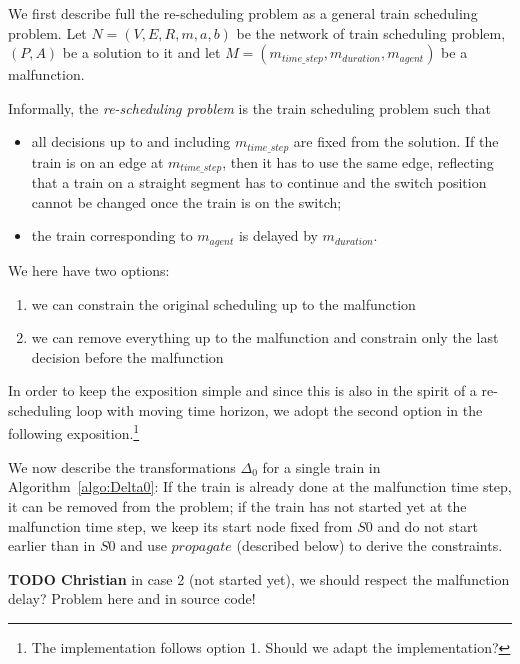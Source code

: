 \documentclass{article}
\begin{document}
We first describe full the re-scheduling problem as a general train scheduling problem. Let $N=(V,E,R,m,a,b)$ be the network of train scheduling problem, $(P,A)$ be a solution to it and let $M=(m_{time\_step},m_{duration},m_{agent})$ be a malfunction.

Informally, the \emph{re-scheduling problem} is the train scheduling problem such that
\begin{itemize}
    \item all decisions up to and including $m_{time\_step}$ are fixed from the solution. If the train is on an edge at $m_{time\_step}$, then it has to use the same edge, reflecting that a train on a straight segment has to continue and the switch position cannot be changed once the train is on the switch;
    \item the train corresponding to $m_{agent}$ is delayed by $m_{duration}$.
\end{itemize}
We here have two options:
\begin{enumerate}
    \item we can constrain the original scheduling up to the malfunction
    \item we can remove everything up to the malfunction and constrain only the last decision before the malfunction
\end{enumerate}
In order to keep the exposition simple and since this is also in the spirit of a re-scheduling loop with moving time horizon, we adopt the second option in the following exposition.\footnote{The implementation follows option 1. Should we adapt the implementation?}



We now describe the transformations $\Delta_0$ for a single train in Algorithm~\ref{algo:Delta0}:
If the train is already done at the malfunction time step, it can be removed from the problem; 
if the train has not started yet at the malfunction time step, we keep its start node fixed from $S0$ and do not start earlier than in $S0$ and use $propagate$ (described below) to derive the constraints. 




\begin{mdframed}
{\bf TODO Christian} in case 2 (not started yet), we should respect the malfunction delay? Problem here and in source code!
\end{mdframed}
\end{document}
